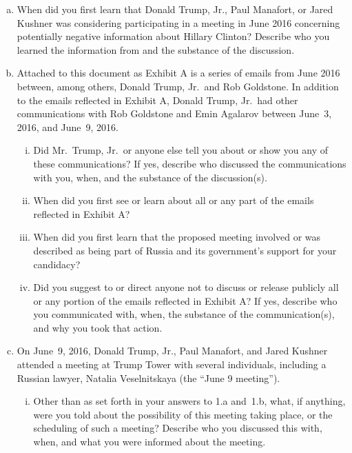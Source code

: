 \begin{enumerate}[a.]

\item When did you first learn that Donald Trump, Jr., Paul Manafort, or Jared Kushner was considering participating in a meeting in June 2016 concerning potentially negative information about Hillary Clinton?
Describe who you learned the information from and the substance of the discussion.

\item Attached to this document as Exhibit A is a series of emails from June 2016 between, among others, Donald Trump, Jr.\ and Rob Goldstone.
In addition to the emails reflected in Exhibit A, Donald Trump, Jr.\ had other communications with Rob Goldstone and Emin Agalarov between June~3, 2016, and June~9, 2016.

\begin{enumerate}[i.]

\item Did Mr.~Trump, Jr.\ or anyone else tell you about or show you any of these communications?
If yes, describe who discussed the communications with you, when, and the substance of the discussion(s).

\item When did you first see or learn about all or any part of the emails reflected in Exhibit A?

\item When did you first learn that the proposed meeting involved or was described as being part of Russia and its government's support for your candidacy?

\item Did you suggest to or direct anyone not to discuss or release publicly all or any portion of the emails reflected in Exhibit A? If yes, describe who you communicated with, when, the substance of the communication(s), and why you took that action.

\end{enumerate}

\item On June~9, 2016, Donald Trump, Jr., Paul Manafort, and Jared Kushner attended a meeting at Trump Tower with several individuals, including a Russian lawyer, Natalia Veselnitskaya (the ``June 9 meeting'').

\begin{enumerate}[i.]

\item Other than as set forth in your answers to 1.a and~1.b, what, if anything, were you told about the possibility of this meeting taking place, or the scheduling of such a meeting?
Describe who you discussed this with, when, and what you were informed about the meeting.


\end{enumerate}
\end{enumerate}
